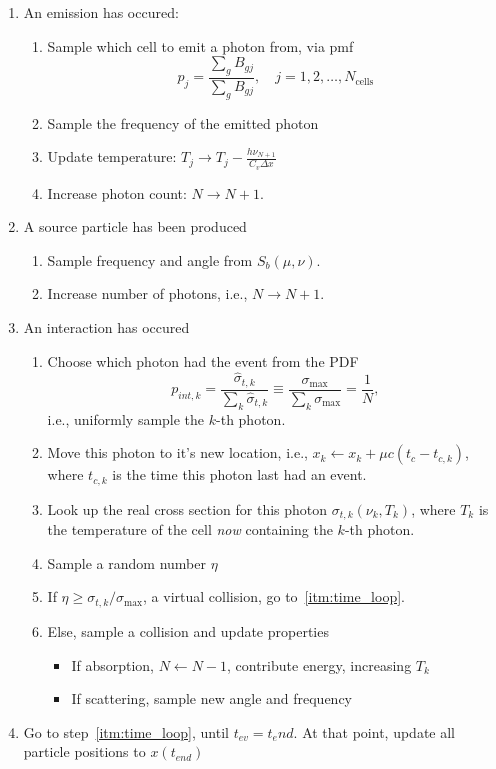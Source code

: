 \documentclass{article}
\newcommand{\ncl}{\ensuremath{N_{\text{cells}}}}
\begin{document}
\begin{enumerate}
\item \label{itm:emission} An emission has occured:
 \begin{enumerate}
    \item Sample which cell to emit a photon from, via pmf
     \begin{equation}
        p_j = \frac{\sum_{g} B_{gj}}{\sum_g B_{gj}}, \quad j=1,2,\ldots,\ncl
      \end{equation}
    \item Sample the frequency of the emitted photon
    \item Update temperature: $T_j \rightarrow T_j - \frac{h \nu_{N+1}}{C_v \Delta x}$
    \item Increase photon count: $N\rightarrow N+1$.
  \end{enumerate}
\item \label{itm:source} A source particle has been produced
\begin{enumerate}
    \item Sample frequency and angle from $S_b(\mu,\nu)$.
    \item Increase number of photons, i.e., $N\rightarrow N+1$.
\end{enumerate}
\item \label{itm:interaction} An interaction has occured
\begin{enumerate}
    \item Choose which photon had the event from the PDF
     \begin{equation}
      p_{int,k} = \frac{\hat\sigma_{t,k}}{\sum_{k} \hat\sigma_{t,k}} \equiv
\frac{\sigma_{\max}}{\sum_{k} \sigma_{\max}} = \frac{1}{N} ,
     \end{equation}
     i.e., uniformly sample the $k$-th photon.
    \item Move this photon to it's new location, i.e., $x_k \leftarrow x_k + \mu c
(t_c - t_{c,k})$, where $t_{c,k}$ is the time this photon last had an event.
    \item Look up the real cross section for this photon $\sigma_{t,k}(\nu_k,T_k)$,
where $T_k$ is the temperature of the cell \emph{now} containing the $k$-th photon.
    \item Sample a random number $\eta$
    \item If $\eta \geq \sigma_{t,k}/\sigma_{\max}$, a virtual collision, go
to~\ref{itm:time_loop}.
    \item Else, sample a collision and update properties 
    \begin{itemize}
    \item If absorption, $N\leftarrow N-1$, contribute energy, increasing $T_k$
    \item If scattering, sample new angle and frequency
     \end{itemize}
\end{enumerate}
     \item Go to step~\ref{itm:time_loop}, until $t_{ev}=t_end$.  At that point,
update all particle positions to $x(t_{end})$
\end{enumerate}
 
\end{document}
